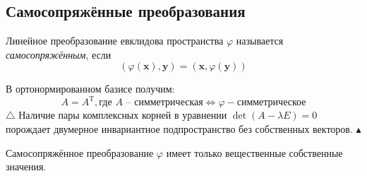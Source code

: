 \subsection{Самосопряжённые преобразования}
	\begin{definition}
	Линейное преобразование евклидова пространства $\varphi$ называется \emph{самосопряжённым}, если 
	\[\boxed {(\varphi (\textbf{x}), \textbf{y}) = (\textbf{x}, \varphi(\textbf{y}))}\]
\end{definition}
В ортонормированном базисе получим:
\[A = A^{\text{T}}, \text{где $A$ -- симметрическая} \Leftrightarrow \varphi - \text{симметрическое}\]
$\triangle$
Наличие пары комплексных корней в уравнении $\det (A - \lambda E) = 0$ порождает двумерное инвариантное подпространство без собственных векторов. $\blacktriangle$
\begin{lemma}
Самосопряжённое преобразование $\varphi$ имеет только вещественные собственные значения.
\end{lemma}
